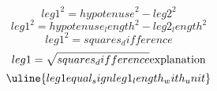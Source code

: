 \[ {leg1}^{2}={hypotenuse}^{2}-{leg2}^{2} \]
\[ {leg1}^{2}={hypotenuse_length}^{2}-{leg2_length}^{2} \]
\[ {leg1}^{2}={squares_difference} \]
\[ {leg1}=\sqrt{\mathstrut {squares_difference}}\text{{explanation}}\]
\[ \uline{{leg1}{equal_sign}{leg1_length_with_unit}}\]